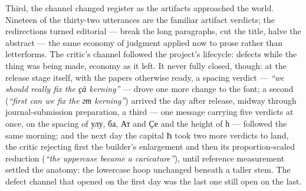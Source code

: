 \documentclass[12pt]{article}
\newcommand{\cz}[1]{{\chu #1}}
\begin{document}
Third, the channel changed register as the artifacts approached the world. Nineteen of the thirty-two utterances are the familiar artifact verdicts; the redirections turned editorial — break the long paragraphs, cut the title, halve the abstract — the same economy of judgment applied now to prose rather than letterforms. The critic's channel followed the project's lifecycle: defects while the thing was being made, economy as it left. It never fully closed, though: at the release stage itself, with the papers otherwise ready, a spacing verdict — \emph{``we should really fix the \cz{ҫӓ} kerning''} — drove one more change to the font; a second (\emph{``first can we fix the \cz{гт} kerning''}) arrived the day after release, midway through journal-submission preparation, a third — one message carrying five verdicts at once, on the spacing of \cz{улу}, \cz{ба}, \cz{Ат} and \cz{Ҫе} and the height of \cz{һ} — followed the same morning; and the next day the capital \cz{Һ} took two more verdicts to land, the critic rejecting first the builder's enlargement and then its proportion-scaled reduction (\emph{``the uppercase became a caricature''}), until reference measurement settled the anatomy: the lowercase hoop unchanged beneath a taller stem. The defect channel that opened on the first day was the last one still open on the last.
\end{document}
